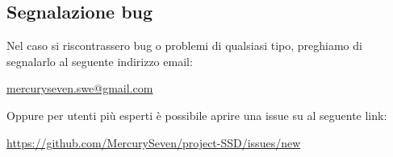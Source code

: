 \subsection{Segnalazione bug}

Nel caso si riscontrassero bug o problemi di qualsiasi tipo, preghiamo di segnalarlo al seguente indirizzo email:
\newline{}\centerline{\url{mercuryseven.swe@gmail.com}}
Oppure per utenti più esperti è possibile aprire una issue su  al seguente link:
\newline{}\centerline{\url{https://github.com/MercurySeven/project-SSD/issues/new}}